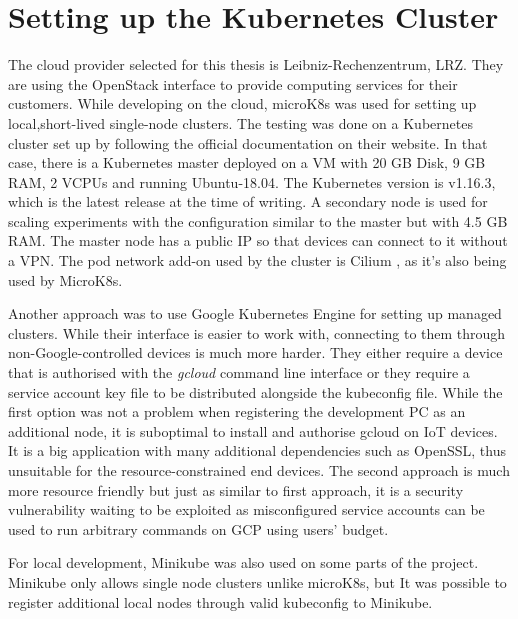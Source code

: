 \section{Setting up the Kubernetes Cluster}
The cloud provider selected for this thesis is Leibniz-Rechenzentrum, LRZ. They are using the OpenStack \cite{openstack} interface to provide computing services for their customers. While developing on the cloud, microK8s was used for setting up local,short-lived single-node clusters. The testing was done on a Kubernetes cluster set up by following the official documentation on their website. In that case, there is a Kubernetes master deployed on a VM with 20 GB Disk, 9 GB RAM, 2 VCPUs and running Ubuntu-18.04. The Kubernetes version is v1.16.3, which is the latest release at the time of writing. A secondary node is used for scaling experiments with the configuration similar to the master but with 4.5 GB RAM. The master node has a public IP so that devices can connect to it without a VPN. The pod network add-on used by the cluster is Cilium \cite{cilium}, as it's also being used by MicroK8s.

Another approach was to use Google Kubernetes Engine for setting up managed clusters. While their interface is easier to work with, connecting to them through non-Google-controlled devices is much more harder. They either require a device that is authorised with the \textit{gcloud} command line interface or they require a service account key file to be distributed alongside the kubeconfig file. While the first option was not a problem when registering the development PC as an additional node, it is suboptimal to install and authorise gcloud on IoT devices. It is a big application with many additional dependencies such as OpenSSL, thus unsuitable for the resource-constrained end devices. The second approach is much more resource friendly but just as similar to first approach, it is a security vulnerability waiting to be exploited as misconfigured service accounts can be used to run arbitrary commands on GCP using users' budget.

For local development, Minikube was also used on some parts of the project. Minikube only allows single node clusters unlike microK8s, but It was possible to register additional local nodes through valid kubeconfig to Minikube.
